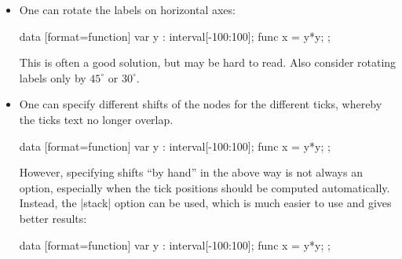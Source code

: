 \begin{itemize}
    \item One can rotate the labels on horizontal axes:
\begin{codeexample}[preamble={\usetikzlibrary{datavisualization.formats.functions}}]
\tikz \datavisualization [scientific axes,
                          all axes={length=2.5cm},
                          x axis={ticks={node style={rotate=90, anchor=east}}},
                          visualize as smooth line]
  data [format=function] {
    var y : interval[-100:100];
    func x = \value y*\value y;
  };
\end{codeexample}
        This is often a good solution, but may be hard to read. Also consider
        rotating labels only by $45^\circ$ or $30^\circ$.
    \item One can specify different shifts of the nodes for the different
        ticks, whereby the ticks text no longer overlap.
\begin{codeexample}[preamble={\usetikzlibrary{datavisualization.formats.functions}}]
\tikz \datavisualization [scientific axes,
                          all axes={length=2.5cm},
                          x axis={ticks={major at={0,4000,8000,
                                2000 as [node style={yshift=-1em}],
                                6000 as [node style={yshift=-1em}],
                                10000 as [node style={yshift=-1em}]}}},
                          visualize as smooth line]
  data [format=function] {
    var y : interval[-100:100];
    func x = \value y*\value y;
  };
\end{codeexample}
        However, specifying shifts ``by hand'' in the above way is not always
        an option, especially when the tick positions should be computed
        automatically. Instead, the |stack| option can be used, which is much
        easier to use and gives better results:
\begin{codeexample}[preamble={\usetikzlibrary{datavisualization.formats.functions}}]
\tikz \datavisualization [scientific axes,
                          all axes={length=2.5cm}, x axis={ticks=stack},
                          visualize as smooth line]
  data [format=function] {
    var y : interval[-100:100];
    func x = \value y*\value y;
  };
\end{codeexample}
\end{itemize}

